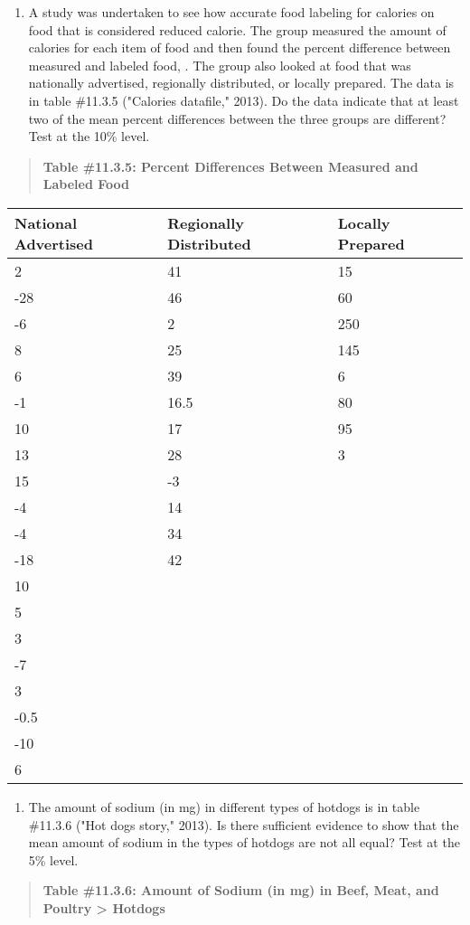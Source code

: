 \documentclass[]{book}
\providecommand{\tightlist}{%
  \setlength{\itemsep}{0pt}\setlength{\parskip}{0pt}}
\begin{document}
\begin{enumerate}
\def\labelenumi{\arabic{enumi}.}
\setcounter{enumi}{3}
\tightlist
\item
  A study was undertaken to see how accurate food labeling for calories on food that is considered reduced calorie. The group measured the amount of calories for each item of food and then found the percent difference between measured and labeled food, . The group also looked at food that was nationally advertised, regionally distributed, or locally prepared. The data is in table \#11.3.5 ("Calories datafile," 2013). Do the data indicate that at least two of the mean percent differences between the three groups are different? Test at the 10\% level.
\end{enumerate}

\begin{quote}
\textbf{Table \#11.3.5: Percent Differences Between Measured and Labeled
Food}
\end{quote}

\begin{longtable}[]{@{}lll@{}}
\toprule
National Advertised & Regionally Distributed & Locally Prepared\tabularnewline
\midrule
\endhead
2 & 41 & 15\tabularnewline
-28 & 46 & 60\tabularnewline
-6 & 2 & 250\tabularnewline
8 & 25 & 145\tabularnewline
6 & 39 & 6\tabularnewline
-1 & 16.5 & 80\tabularnewline
10 & 17 & 95\tabularnewline
13 & 28 & 3\tabularnewline
15 & -3 &\tabularnewline
-4 & 14 &\tabularnewline
-4 & 34 &\tabularnewline
-18 & 42 &\tabularnewline
10 & &\tabularnewline
5 & &\tabularnewline
3 & &\tabularnewline
-7 & &\tabularnewline
3 & &\tabularnewline
-0.5 & &\tabularnewline
-10 & &\tabularnewline
6 & &\tabularnewline
\bottomrule
\end{longtable}

\begin{enumerate}
\def\labelenumi{\arabic{enumi}.}
\setcounter{enumi}{4}
\tightlist
\item
  The amount of sodium (in mg) in different types of hotdogs is in table \#11.3.6 ("Hot dogs story," 2013). Is there sufficient evidence to show that the mean amount of sodium in the types of hotdogs are not all equal? Test at the 5\% level.
\end{enumerate}

\begin{quote}
\textbf{Table \#11.3.6: Amount of Sodium (in mg) in Beef, Meat, and Poultry \textgreater{} Hotdogs}
\end{quote}
\end{document}
